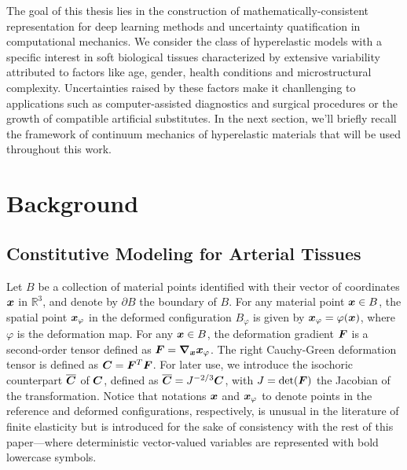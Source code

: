 The goal of this thesis lies in the construction of mathematically-consistent representation for deep learning methods and uncertainty quatification in computational mechanics. We consider the class of hyperelastic models with a specific interest in soft biological tissues characterized by extensive variability attributed to factors like age, gender, health conditions and microstructural complexity. Uncertainties raised by these factors make it chanllenging to applications such as computer-assisted diagnostics and surgical procedures or the growth of compatible artificial substitutes. In the next section, we'll briefly recall the framework of continuum mechanics of hyperelastic materials that will be used throughout this work.

\section{Background}

\subsection{Constitutive Modeling for Arterial Tissues}
\label{subsubsec:constitutive-modeling}
Let $B$ be a collection of material points identified with their vector of coordinates $\boldsymbol{x}$ in $\mathbb{R}^3$, and denote by $\partial B$ the boundary of $B$. For any material point $\boldsymbol{x} \in B$, the spatial point $\boldsymbol{x}_\varphi$ in the deformed configuration $B_\varphi$ is given by $\boldsymbol{x}_\varphi = \varphi (\boldsymbol{x})$, where $\varphi$ is the deformation map. For any $\boldsymbol{x} \in B$, the deformation gradient $\boldsymbol{F}$ is a second-order tensor defined as $\boldsymbol{F} = \boldsymbol{\nabla}_{\boldsymbol{x}} \boldsymbol{x}_\varphi$. The right Cauchy-Green deformation tensor is defined as $\boldsymbol{C} = \boldsymbol{F}^T \boldsymbol{F}$. For later use, we introduce the isochoric counterpart $\overline{\boldsymbol{C}}$ of $\boldsymbol{C}$, defined as $\overline{\boldsymbol{C}} = J^{-2/3}\boldsymbol{C}$, with $J = \det(\boldsymbol{F})$ the Jacobian of the transformation. Notice that notations $\boldsymbol{x}$ and $\boldsymbol{x}_\varphi$ to denote points in the reference and deformed configurations, respectively, is unusual in the literature of finite elasticity \cite{Ciarlet1988} but is introduced for the sake of consistency with the rest of this paper---where deterministic vector-valued variables are represented with bold lowercase symbols.

